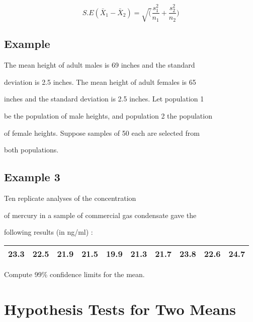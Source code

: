  

\begin{equation}

S.E(\bar{X}_{1}-\bar{X}_{2}) =

\sqrt(\frac{s^2_{1}}{n_{1}}+\frac{s^2_{2}}{n_{2}})

\end{equation}

 

\subsection{Example}

The mean height of adult males is 69 inches and the standard

deviation is 2.5 inches. The mean height of adult females is 65

inches and the standard deviation is 2.5 inches. Let population 1

be the population of male heights, and population 2 the population

of female heights. Suppose samples of 50 each are selected from

both populations.

 





\subsection{Example 3} Ten replicate analyses of the concentration

of mercury in a sample of commercial gas condensate gave the

following results (in ng/ml) :

 

\begin{tabular}{|c|c|c|c|c|c|c|c|c|c|}

  \hline

23.3 & 22.5 & 21.9 & 21.5 & 19.9 & 21.3 & 21.7 & 23.8 & 22.6 &

24.7\\

  \hline

\end{tabular}

 

Compute 99\% confidence limits for the mean.

\section{Hypothesis Tests for Two Means}

